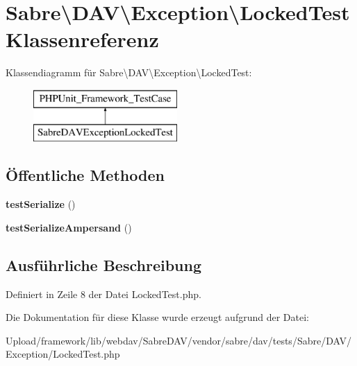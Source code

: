 \hypertarget{class_sabre_1_1_d_a_v_1_1_exception_1_1_locked_test}{}\section{Sabre\textbackslash{}D\+AV\textbackslash{}Exception\textbackslash{}Locked\+Test Klassenreferenz}
\label{class_sabre_1_1_d_a_v_1_1_exception_1_1_locked_test}
Klassendiagramm für Sabre\textbackslash{}D\+AV\textbackslash{}Exception\textbackslash{}Locked\+Test\+:\begin{figure}[H]
\begin{center}
\leavevmode
\includegraphics[height=2.000000cm]{class_sabre_1_1_d_a_v_1_1_exception_1_1_locked_test}
\end{center}
\end{figure}
\subsection*{Öffentliche Methoden}
\begin{DoxyCompactItemize}
\item 
\mbox{\label{class_sabre_1_1_d_a_v_1_1_exception_1_1_locked_test_a2c0ce5acfa1b6f2fb0c080ed73ab1d0f}} 
{\bfseries test\+Serialize} ()
\item 
\mbox{\label{class_sabre_1_1_d_a_v_1_1_exception_1_1_locked_test_a228f152c5eab6af731db8de6ded36e84}} 
{\bfseries test\+Serialize\+Ampersand} ()
\end{DoxyCompactItemize}


\subsection{Ausführliche Beschreibung}


Definiert in Zeile 8 der Datei Locked\+Test.\+php.



Die Dokumentation für diese Klasse wurde erzeugt aufgrund der Datei\+:\begin{DoxyCompactItemize}
\item 
Upload/framework/lib/webdav/\+Sabre\+D\+A\+V/vendor/sabre/dav/tests/\+Sabre/\+D\+A\+V/\+Exception/Locked\+Test.\+php\end{DoxyCompactItemize}
